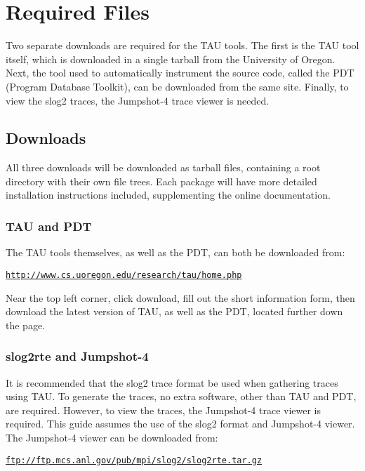 \documentclass[11pt,letterpaper]{article}
\begin{document}

\section{Required Files}
Two separate downloads are required for the TAU tools. The first is the TAU tool itself, which is downloaded in a single tarball from the University of Oregon. Next, the tool used to automatically instrument the source code, called the PDT (Program Database Toolkit), can be downloaded from the same site. Finally, to view the slog2 traces, the Jumpshot-4 trace viewer is needed.

\subsection{Downloads}
All three downloads will be downloaded as tarball files, containing a root directory with their own file trees. Each package will have more detailed installation instructions included, supplementing the online documentation.

\subsubsection{TAU and PDT}
The TAU tools themselves, as well as the PDT, can both be downloaded from:
\begin{link_url}
\texttt{\url{http://www.cs.uoregon.edu/research/tau/home.php}}
\end{link_url}

Near the top left corner, click download, fill out the short information form, then download the latest version of TAU, as well as the PDT, located further down the page.

\subsubsection{slog2rte and Jumpshot-4}
It is recommended that the slog2 trace format be used when gathering traces using TAU. To generate the traces, no extra software, other than TAU and PDT, are required. However, to view the traces, the Jumpshot-4 trace viewer is required. This guide assumes the use of the slog2 format and Jumpshot-4 viewer. The Jumpshot-4 viewer can be downloaded from:
\begin{link_url}
\texttt{\url{ftp://ftp.mcs.anl.gov/pub/mpi/slog2/slog2rte.tar.gz}}
\end{link_url}
\end{document}
